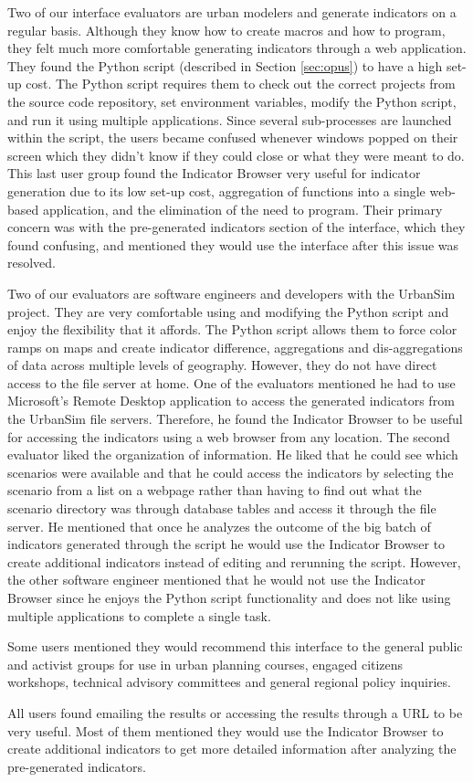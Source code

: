 Two of our interface evaluators are urban modelers and generate indicators
on a regular basis. Although they know how to create macros and how to
program, they felt much more comfortable generating indicators through a
web application. They found the Python script (described in Section
\ref{sec:opus}) to have a high set-up cost. The Python script requires them
to check out the correct projects from the source code
repository, set environment
variables, modify the Python script, and run it using multiple
applications.  Since several sub-processes are launched within the script,
the users became confused whenever windows popped on their screen which
they didn't know if they could close or what they were meant to do. 
This last user group found the Indicator
Browser very useful for indicator generation due to its low set-up cost,
aggregation of functions into a single web-based application, and the
elimination of the need to program. Their primary concern was with the
pre-generated indicators section of the interface, which they found
confusing, and mentioned they would
use the interface after this issue was resolved.

Two of our evaluators are software engineers and developers with the
UrbanSim project. They are very comfortable using and modifying the Python
script and enjoy the flexibility that it affords. The Python script allows
them to force color ramps on maps and create indicator difference,
aggregations and dis-aggregations of data across multiple levels of
geography. However, they do not have direct access to the file server at
home. One of the evaluators mentioned he had to use Microsoft's Remote
Desktop application to access the generated indicators from the UrbanSim
file servers. Therefore, he found the Indicator Browser to be useful for
accessing the indicators using a web browser from any
location. The second evaluator liked the organization of information. He
liked that he could see which scenarios were available and that he could
access the indicators by selecting the scenario from a list on a webpage
rather than having to find out what the scenario directory was through
database tables and access it through the file server.  He mentioned that
once he analyzes the outcome of the big batch of indicators generated
through the script he would use the Indicator Browser to create additional
indicators instead of editing and rerunning the script. However, the
other software engineer mentioned that he would not use the Indicator
Browser since he enjoys the Python script functionality and does not like
using multiple applications to complete a single task.

Some users mentioned they would recommend this interface to the general
public and activist groups for use in urban planning courses, engaged
citizens workshops, technical advisory committees and general regional
policy inquiries.

All users found emailing the results or accessing the results through a URL
to be very useful. Most of them mentioned they would use the Indicator
Browser to create additional indicators to get more detailed information
after analyzing the pre-generated indicators.


